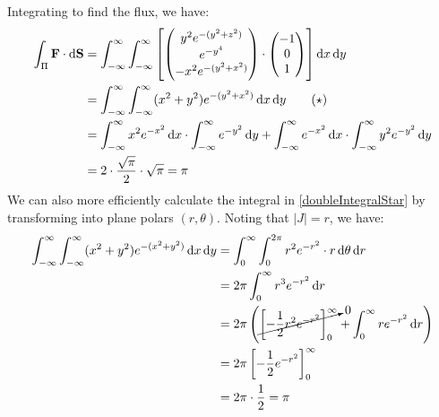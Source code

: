 \documentclass[../main.tex]{subfiles}
\begin{document}
\begin{example}
  Integrating to find the flux, we have:
  \begin{align}
    \int_{\Pi} \vec{F} \cdot \d{\vec{S}} &= \int_{-\infty}^{\infty} \int_{-\infty}^{\infty} \left[\begin{pmatrix}
        y^2 e^{-(y^2 + z^2)} \\
        e^{-y^4} \\
        -x^2 e^{-(y^2 + x^2)} \\
        \end{pmatrix} \cdot \begin{pmatrix}
        -1 \\
        0 \\
        1 \\
        \end{pmatrix}\right]\d{x} \d{y} \nonumber \\
                                         &= \int_{-\infty}^{\infty} \int_{-\infty}^{\infty} (x^2 + y^2)e^{-(y^2 + x^2)} \d{x} \d{y} \tag{$\star$} \label{doubleIntegralStar} \\
                                         &= \int_{-\infty}^{\infty} x^2 e^{-x^2} \d{x} \cdot \int_{-\infty}^{\infty} e^{-y^2} \d{y} + \int_{-\infty}^{\infty} e^{-x^2} \d{x} \cdot \int_{-\infty}^{\infty} y^2e^{-y^2} \d{y} \nonumber \\
                                         &= 2 \cdot \frac{\sqrt{\pi}}{2} \cdot \sqrt{\pi} = \pi \nonumber
  \end{align}
  We can also more efficiently calculate the integral in \cref{doubleIntegralStar} by transforming into plane polars $(r, \theta)$.
  Noting that $|J| = r$, we have:
  \begin{align*}
    \int_{-\infty}^{\infty} \int_{-\infty}^{\infty} (x^2 + y^2)e^{-(x^2 + y^2)} \d{x} \d{y} &= \int_{0}^{\infty} \int_{0}^{2\pi} r^2 e^{-r^2} \cdot r \d{\theta} \d{r} \\
                                                                                            &= 2\pi \int_{0}^{\infty} r^3 e^{-r^2}\d{r} \\
                                                                                            &= 2\pi \left(\cancelto{0}{\eval{-\frac{1}{2}r^2e^{-r^2}}{0}{\infty}} + \int_{0}^{\infty} re^{-r^2} \d{r}\right) \\
                                                                                            &= 2\pi \eval{-\frac{1}{2}e^{-r^2}}{0}{\infty} \\
                                                                                            &= 2\pi \cdot \frac{1}{2} = \pi
  \end{align*}
\end{example}
\end{document}
